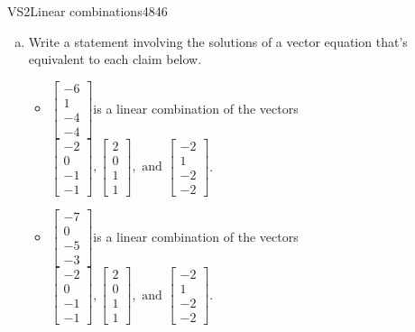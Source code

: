 \documentclass{article}
\newenvironment{exerciseStatement}{}{}
\begin{document}
 
\begin{exercise}{VS2}{Linear combinations}{4846} 

\begin{exerciseStatement} 

\begin{enumerate}[(a)]
\item  

 Write a statement involving the solutions of a vector equation that's equivalent to each claim below. 

 

\begin{itemize}
\item   \(\left[\begin{array}{c}
-6 \\
1 \\
-4 \\
-4
\end{array}\right]\)is a linear combination of the vectors \(\left[\begin{array}{c}
-2 \\
0 \\
-1 \\
-1
\end{array}\right] , \left[\begin{array}{c}
2 \\
0 \\
1 \\
1
\end{array}\right] , \text{ and } \left[\begin{array}{c}
-2 \\
1 \\
-2 \\
-2
\end{array}\right]\). 

 
\item   \(\left[\begin{array}{c}
-7 \\
0 \\
-5 \\
-3
\end{array}\right]\)is a linear combination of the vectors \(\left[\begin{array}{c}
-2 \\
0 \\
-1 \\
-1
\end{array}\right] , \left[\begin{array}{c}
2 \\
0 \\
1 \\
1
\end{array}\right] , \text{ and } \left[\begin{array}{c}
-2 \\
1 \\
-2 \\
-2
\end{array}\right]\). 


\end{itemize}
\end{enumerate}
\end{exerciseStatement}
\end{exercise}
\end{document}
